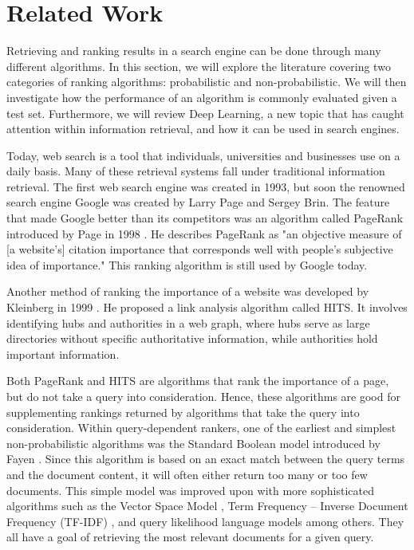 \section{Related Work}
Retrieving and ranking results in a search engine can be done through many different algorithms. In this section, we will explore the literature covering two categories of ranking algorithms: probabilistic and non-probabilistic. We will then investigate how the performance of an algorithm is commonly evaluated given a test set. Furthermore, we will review Deep Learning, a new topic that has caught attention within information retrieval, and how it can be used in search engines.

Today, web search is a tool that individuals, universities and businesses use on a daily basis. Many of these retrieval systems fall under traditional information retrieval. The first web search engine was created in 1993, but soon the renowned search engine Google was created by Larry Page and Sergey Brin. The feature that made Google better than its competitors was an algorithm called PageRank introduced by Page in 1998 \cite{brin1998anatomy}. He describes PageRank as "an objective measure of [a website's] citation importance that corresponds well with people's subjective idea of importance." This ranking algorithm is still used by Google today.

Another method of ranking the importance of a website was developed by Kleinberg in 1999 \cite{kleinberg1999authoritative}. He proposed a link analysis algorithm called HITS. It involves identifying hubs and authorities in a web graph, where hubs serve as large directories without specific authoritative information, while authorities hold important information. %

Both PageRank and HITS are algorithms that rank the importance of a page, but do not take a query into consideration. Hence, these algorithms are good for supplementing rankings returned by algorithms that take the query into consideration. Within query-dependent rankers, one of the earliest and simplest non-probabilistic algorithms was the Standard Boolean model introduced by Fayen \cite{lancaster1973information}. Since this algorithm is based on an exact match between the query terms and the document content, it will often either return too many or too few documents. This simple model was improved upon with more sophisticated algorithms such as the Vector Space Model \cite{salton1975vector}, Term Frequency -- Inverse Document Frequency (TF-IDF) \cite{salton1983mcgill}, and query likelihood language models \cite{zhai2001model} among others. They all have a goal of retrieving the most relevant documents for a given query. \\


